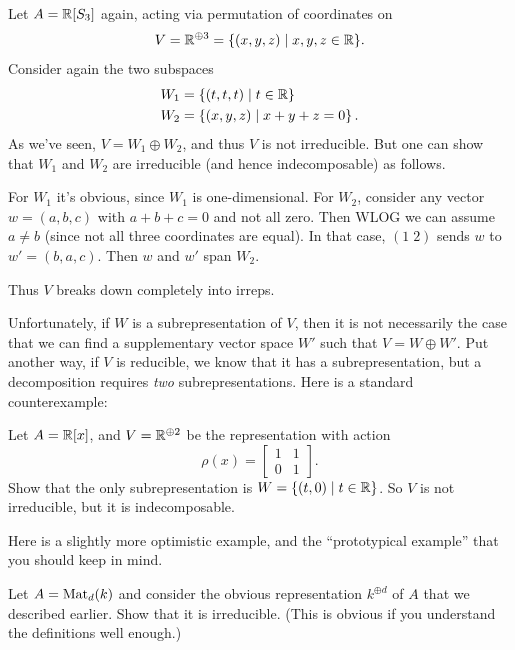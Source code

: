 \begin{example}
	Let $A = \mathbb R[S_3]$ again, acting via permutation of coordinates on
	\[ V = \mathbb R^{\oplus 3} = \{ (x,y,z) \mid x,y,z \in \mathbb R \}. \]
	Consider again the two subspaces
	\begin{align*}
		W_1 &= \left\{ (t,t,t) \mid t \in \mathbb R \right\} \\
		W_2 &= \left\{ (x,y,z) \mid x+y+z = 0 \right\}.
	\end{align*}
	As we've seen, $V = W_1 \oplus W_2$, and thus $V$ is not irreducible.
	But one can show that $W_1$ and $W_2$ are irreducible
	(and hence indecomposable) as follows.
	\begin{itemize}
		\ii For $W_1$ it's obvious, since $W_1$ is one-dimensional.
		\ii For $W_2$, consider any vector $w = (a,b,c)$
		with $a+b+c=0$ and not all zero.  Then WLOG we can assume $a \neq b$
		(since not all three coordinates are equal).
		In that case, $(1 \; 2)$ sends $w$ to $w' = (b,a,c)$.
		Then $w$ and $w'$ span $W_2$.
	\end{itemize}
	Thus $V$ breaks down completely into irreps.
\end{example}

Unfortunately, if $W$ is a subrepresentation of $V$,
then it is not necessarily the case that we can find a
supplementary vector space $W'$ such that $V = W \oplus W'$.
Put another way, if $V$ is reducible, we know that it has a subrepresentation,
but a decomposition requires \emph{two} subrepresentations.
Here is a standard counterexample:
\begin{exercise}
	\label{exer:irred_not_indecomp}
	Let $A = \mathbb R[x]$, and $V = \mathbb R^{\oplus 2}$ be the representation with action
	\[ \rho(x) = \begin{bmatrix} 1 & 1 \\ 0 & 1 \end{bmatrix}. \]
	Show that the only subrepresentation is $W = \{ (t,0) \mid t \in \mathbb R \}$.
	So $V$ is not irreducible, but it is indecomposable.
\end{exercise}

Here is a slightly more optimistic example,
and the ``prototypical example'' that you should keep in mind.

\begin{exercise}
	Let $A = \mathrm{Mat}_d(k)$ and consider the obvious representation $k^{\oplus d}$
	of $A$ that we described earlier. Show that it is irreducible.
	(This is obvious if you understand the definitions well enough.)
\end{exercise}

